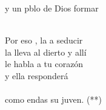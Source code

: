 \begin{cancion}
	y un pblo de Dios formar  \\\jump\\
	\begin{chorus}%
	Por eso , la  a seducir\\
	la lleva al dierto y allí\\
	le habla a tu corazón \\
	y ella  responderá\\
{}\vspace*{-0.4cm}\\
	como endas su juven. (**)\\
	\end{chorus}%
	\jump\\
\end{cancion}%
